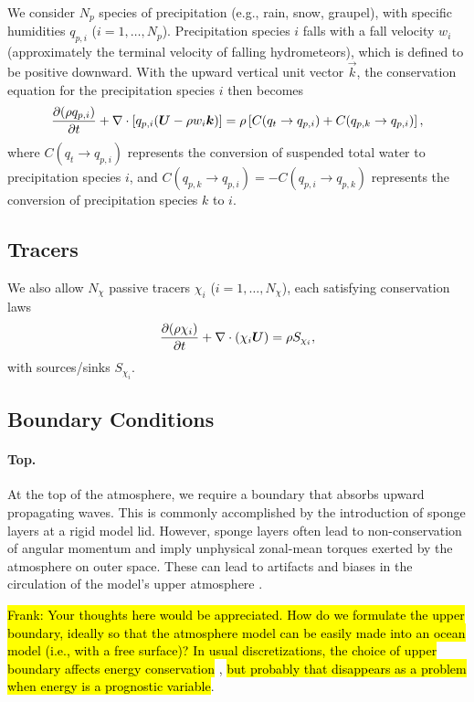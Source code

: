 \documentclass{article}
\begin{document}
We  consider $N_p$ species of precipitation (e.g., rain, snow, graupel), with specific humidities $q_{p,i}$ ($i=1,\dots,N_p$). Precipitation species $i$ falls with a fall velocity $w_i$ (approximately the terminal velocity of falling hydrometeors), which is defined to be positive downward. With the upward vertical unit vector $\vec{k}$, the conservation equation for the precipitation species $i$ then becomes
\begin{equation}
\frac{\partial (\rho q_{p,i})}{\partial t} + \nabla \cdot \left[q_{p,i} (\boldsymbol{{U}} - \rho w_i \boldsymbol{{k}}) \right] = \rho \left[C(q_t \rightarrow q_{p,i}) + C(q_{p,k} \rightarrow q_{p,i}) \right],   
\label{eq:precip}
\end{equation}
where $C(q_t \rightarrow q_{p,i})$ represents the conversion of suspended total water to precipitation species $i$, and $C(q_{p,k} \rightarrow q_{p,i}) = -C(q_{p,i} \rightarrow q_{p,k})$ represents the conversion of precipitation species $k$ to $i$.

\subsection{Tracers}

We also allow $N_\chi$ passive tracers $\chi_i$ ($i=1, \dots, N_\chi$), each satisfying conservation laws
\begin{equation}
\frac{\partial (\rho \chi_i)}{\partial t} + \nabla \cdot \left(\chi_i \boldsymbol{{U}} \right) = \rho S_{\chi_i},   
\label{eq:tracers}
\end{equation}
with sources/sinks $S_{\chi_i}$.
 
\subsection{Boundary Conditions}

\paragraph{Top.} At the top of the atmosphere, we require a boundary that absorbs upward propagating waves. This is commonly accomplished by the introduction of sponge layers at a rigid model lid. However, sponge layers often lead to non-conservation of angular momentum and imply unphysical zonal-mean torques exerted by the atmosphere on outer space. These can lead to artifacts and biases in the circulation of the model's upper atmosphere \citep[e.g.,][]{Shepherd96a}.

\hl{Frank: Your thoughts here would be appreciated. How do we formulate the upper boundary, ideally so that the atmosphere model can be easily made into an ocean model (i.e., with a free surface)? In usual discretizations, the choice of upper boundary affects energy conservation} \citep[e.g.,][]{Staniforth03a}, \hl{but probably that disappears as a problem when energy is a prognostic variable}.
\end{document}
